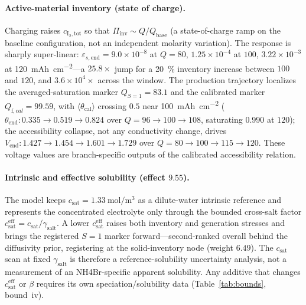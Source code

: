 \documentclass[11pt]{article}
\newcommand{\csat}{c_{\mathrm{sat}}}
\newcommand{\thetacal}{\theta_{\mathrm{cal}}}
\newcommand{\mAhcm}{\si{mAh.cm^{-2}}}
\begin{document}
\paragraph{Active-material inventory (state of charge).} Charging raises $c_{\mathrm{I_2,tot}}$ so that
$\Pi_{\mathrm{inv}}\sim Q/Q_{\mathrm{base}}$ (a state-of-charge ramp on the baseline configuration, not an
independent molarity variation). The response is sharply super-linear:
$\varepsilon_{s,\mathrm{end}}=9.0\times10^{-8}$ at $Q=80$, $1.25\times10^{-4}$ at $100$, $3.22\times10^{-3}$ at
\SI{120}{\mAhcm}---a $25.8\times$ jump for a \SI{20}{\percent} inventory increase between $100$ and $120$, and
$3.6\times10^{4}\times$ across the window. The production trajectory localizes the averaged-saturation marker
$Q_{S=1}=83.1$ and
the calibrated marker $Q_{\mathrm f,cal}=99.59$, with $\langle\thetacal\rangle$ crossing $0.5$ near
\SI{100}{\mAhcm}
($\theta_{\mathrm{end}}:0.335\to0.519\to0.824$ over $Q=96\to100\to108$, saturating $0.990$ at $120$); the
accessibility collapse, not any conductivity change, drives $V_{\mathrm{end}}:1.427\to1.454\to1.601\to1.729$
over $Q=80\to100\to115\to120$. These voltage values are branch-specific outputs of the calibrated
accessibility relation.

\paragraph{Intrinsic and effective solubility (effect $9.55$).} The model keeps
$\csat=\SI{1.33}{\mol\per\meter\cubed}$ as a dilute-water intrinsic reference and represents the concentrated
electrolyte only through the bounded cross-salt factor
$\csat^{\mathrm{eff}}=\csat/\gamma_{\mathrm{salt}}$. A lower $\csat^{\mathrm{eff}}$ raises both inventory and
generation stresses and brings the registered $S=1$ marker forward---second-ranked overall behind the
diffusivity prior, registering at the solid-inventory node (weight $6.49$). The $\csat$ scan at fixed
$\gamma_{\mathrm{salt}}$ is therefore a reference-solubility uncertainty analysis, not a measurement of an
NH4Br-specific apparent solubility. Any additive that changes $\csat^{\mathrm{eff}}$ or $\beta$ requires its
own speciation/solubility data (Table~\ref{tab:bounds}, bound~iv).
\end{document}
